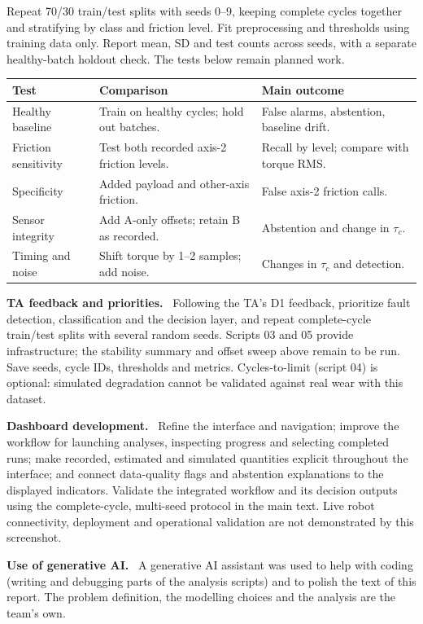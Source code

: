 \documentclass[10pt,letterpaper]{article}
\newcommand{\heading}[1]{\vspace{5pt}{\large\bfseries #1}\par\vspace{1pt}}
\newcommand{\subhead}[1]{\textbf{#1}\ }
\begin{document}
\heading{Future Work and Remaining Experiments}
Repeat 70/30 train/test splits with seeds 0--9, keeping complete cycles together and stratifying by class and friction level. Fit preprocessing and thresholds using training data only. Report mean, SD and test counts across seeds, with a separate healthy-batch holdout check. The tests below remain planned work.

{\small
\begin{tabularx}{\linewidth}{@{}L{2.4cm}Y L{4.7cm}@{}}
\toprule
\textbf{Test} & \textbf{Comparison} & \textbf{Main outcome}\\
\midrule
Healthy baseline & Train on healthy cycles; hold out batches. & False alarms, abstention, baseline drift.\\
Friction sensitivity & Test both recorded axis-2 friction levels. & Recall by level; compare with torque RMS.\\
Specificity & Added payload and other-axis friction. & False axis-2 friction calls.\\
Sensor integrity & Add A-only offsets; retain B as recorded. & Abstention and change in $\tau_c$.\\
Timing and noise & Shift torque by 1--2 samples; add noise. & Changes in $\tau_c$ and detection.\\
\bottomrule
\end{tabularx}
}

\subhead{TA feedback and priorities.}
Following the TA's D1 feedback, prioritize fault detection, classification and the decision layer, and repeat complete-cycle train/test splits with several random seeds. Scripts 03 and 05 provide infrastructure; the stability summary and offset sweep above remain to be run. Save seeds, cycle IDs, thresholds and metrics. Cycles-to-limit (script 04) is optional: simulated degradation cannot be validated against real wear with this dataset.

\subhead{Dashboard development.}
Refine the interface and navigation; improve the workflow for launching analyses, inspecting progress and selecting completed runs; make recorded, estimated and simulated quantities explicit throughout the interface; and connect data-quality flags and abstention explanations to the displayed indicators. Validate the integrated workflow and its decision outputs using the complete-cycle, multi-seed protocol in the main text. Live robot connectivity, deployment and operational validation are not demonstrated by this screenshot.


{\small\subhead{Use of generative AI.}
A generative AI assistant was used to help with coding (writing and debugging parts of the analysis scripts) and to polish the text of this report. The problem definition, the modelling choices and the analysis are the team's own.}
\end{document}
